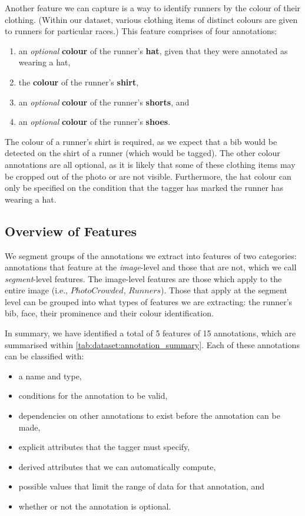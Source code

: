Another feature we can capture is a way to identify runners by the colour of their clothing. (Within our dataset, various clothing items of distinct colours are given to runners for particular races.) This feature comprises of four annotations:

\begin{enumerate}
  \item an \textit{optional} \textbf{colour} of the runner's \textbf{hat}, given that they were annotated as wearing a hat,
  \item the \textbf{colour} of the runner's \textbf{shirt},
  \item an \textit{optional} \textbf{colour} of the runner's \textbf{shorts}, and
  \item an \textit{optional} \textbf{colour} of the runner's \textbf{shoes}.
\end{enumerate}

The colour of a runner's shirt is required, as we expect that a bib would be detected on the shirt of a runner (which would be tagged). The other colour annotations are all optional, as it is likely that some of these clothing items may be cropped out of the photo or are not visible. Furthermore, the hat colour can only be specified on the condition that the tagger has marked the runner has wearing a hat.

\subsection{Overview of Features}

We segment groups of the annotations we extract into features of two categories: annotations that feature at the \textit{image}-level and those that are not, which we call \textit{segment}-level features. The image-level features are those which apply to the entire image (i.e., $PhotoCrowded$, $Runners$). Those that apply at the segment level can be grouped into what types of features we are extracting: the runner's bib, face, their prominence and their colour identification.

In summary, we have identified a total of 5 features of 15 annotations, which are summarised within \cref{tab:dataset:annotation_summary}. Each of these annotations can be classified with:

\begin{itemize}
\item a name and type,
\item conditions for the annotation to be valid,
\item dependencies on other annotations to exist before the annotation can be made,
\item explicit attributes that the tagger must specify,
\item derived attributes that we can automatically compute,
\item possible values that limit the range of data for that annotation, and
\item whether or not the annotation is optional.  
\end{itemize}




